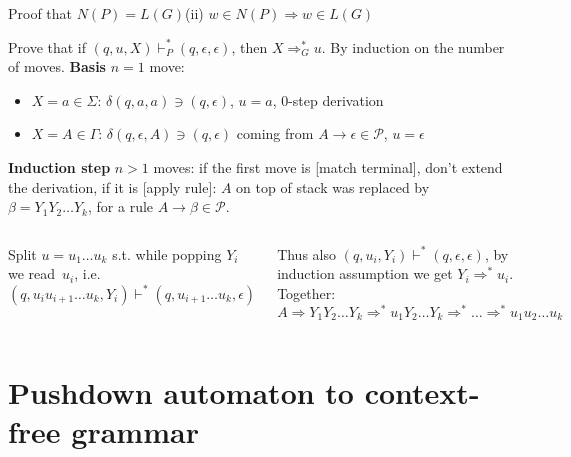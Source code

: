 \documentclass[handout]{beamer}
\begin{document}
\begin{frame}{Proof that $N(P)=L(G)$\hfill \alert{(ii) $w\in N(P)\Rightarrow w\in L(G)$}}

    \vspace{-3pt}
    Prove that if $(q,u,X)\vdash_P^*(q,\epsilon,\epsilon)$, then $X\Rightarrow_G^* u$. By induction on the number of moves. \textbf{Basis} \alert{$n=1$} move:
    \begin{itemize}
        \item $X=a\in\Sigma$: $\delta(q, a, a)\ni (q,\epsilon)$, $u=a$, 0-step derivation
        \item $X=A\in \Gamma$: $\delta(q,\epsilon,A)\ni (q,\epsilon)$ coming from $A\rightarrow\epsilon\in\mathcal P$, $u=\epsilon$
    \end{itemize} 

    \vspace{-3pt}
    \textbf{Induction step} \alert{$n>1$} moves: if the first move is \alert{[match terminal]}, don't extend the derivation, if it is \alert{[apply rule]}: $A$ on top of stack was replaced by $\beta=Y_1Y_2\ldots Y_k$, for a rule $A\to\beta\in\mathcal P$.

    \begin{columns}

    
        Split $u=u_1\ldots u_k$ s.t. while popping $Y_i$ we read~$u_i$, i.e. $(q,u_iu_{i+1}\ldots u_k,Y_i)\vdash^*(q,u_{i+1}\ldots u_k,\epsilon)$

        \medskip
        
        Thus also $(q,u_i,Y_i)\vdash^*(q,\epsilon,\epsilon)$, by induction assumption we get $Y_i\Rightarrow^*u_i$. Together:
        {\small
        $$
        A\Rightarrow Y_1Y_2\ldots Y_k\Rightarrow^* u_1Y_2\ldots Y_k\Rightarrow^* \ldots \Rightarrow^* u_1u_2\ldots u_k
        $$
        } 
        
        \vspace{-6pt}\hfill\qedsymbol
    

        \scalebox{0.85}{
            
        }
        
    \end{columns}    
       
\end{frame}


\section*{Pushdown automaton to context-free grammar}
\end{document}
